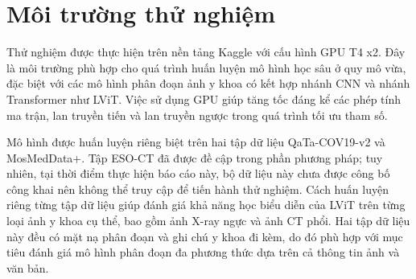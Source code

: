 \section{Môi trường thử nghiệm}

Thử nghiệm được thực hiện trên nền tảng Kaggle với cấu hình GPU T4 x2. Đây là môi trường phù hợp cho quá trình huấn luyện mô hình học sâu ở quy mô vừa, đặc biệt với các mô hình phân đoạn ảnh y khoa có kết hợp nhánh CNN và nhánh Transformer như LViT. Việc sử dụng GPU giúp tăng tốc đáng kể các phép tính ma trận, lan truyền tiến và lan truyền ngược trong quá trình tối ưu tham số.

Mô hình được huấn luyện riêng biệt trên hai tập dữ liệu QaTa-COV19-v2 và MosMedData+. Tập ESO-CT đã được đề cập trong phần phương pháp; tuy nhiên, tại thời điểm thực hiện báo cáo này, bộ dữ liệu này chưa được công bố công khai nên không thể truy cập để tiến hành thử nghiệm. Cách huấn luyện riêng từng tập dữ liệu giúp đánh giá khả năng học biểu diễn của LViT trên từng loại ảnh y khoa cụ thể, bao gồm ảnh X-ray ngực và ảnh CT phổi. Hai tập dữ liệu này đều có mặt nạ phân đoạn và ghi chú y khoa đi kèm, do đó phù hợp với mục tiêu đánh giá mô hình phân đoạn đa phương thức dựa trên cả thông tin ảnh và văn bản.



